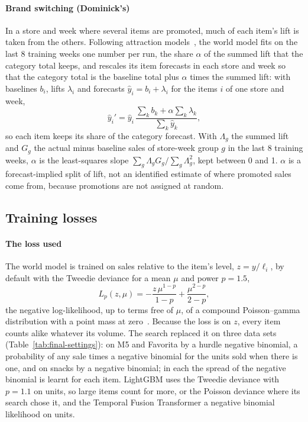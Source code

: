 \paragraph{Brand switching (Dominick's)}
In a store and week where several items are promoted, much of each item's lift
is taken from the others. Following attraction models~\cite{bell1975,cooper1988},
the world model fits on the last 8 training weeks one number per run, the share
$\alpha$ of the summed lift that the category total keeps, and rescales its item
forecasts in each store and week so that the category total is the baseline
total plus $\alpha$ times the summed lift: with baselines $b_i$, lifts
$\lambda_i$ and forecasts $\hat y_i = b_i + \lambda_i$ for the items $i$ of one
store and week,
\begin{equation}
\hat y_i' = \hat y_i\,\frac{\sum_k b_k + \alpha\sum_k \lambda_k}{\sum_k \hat y_k},
\end{equation}
so each item keeps its share of the category forecast. With $\Lambda_g$ the summed
lift and $G_g$ the actual minus baseline sales of store-week group $g$ in the
last 8 training weeks, $\alpha$ is the least-squares slope
$\sum_g \Lambda_g G_g / \sum_g \Lambda_g^2$, kept between 0 and 1.
$\alpha$ is a forecast-implied split
of lift, not an identified estimate of where promoted sales come from, because
promotions are not assigned at random.



\subsection{Training losses}
\label{sec:losses}

\paragraph{The loss used}
The world model is trained on sales relative to the item's level,
$z = y/\ell_i$, by default with the Tweedie deviance for a mean $\mu$ and power
$p = 1.5$,
\begin{equation}
L_p(z, \mu) = -\frac{z\,\mu^{1-p}}{1-p} + \frac{\mu^{2-p}}{2-p},
\end{equation}
the negative log-likelihood, up to terms free of $\mu$, of a compound
Poisson--gamma distribution with a point mass at zero~\cite{jorgensen1987}.
Because the loss is on $z$, every item counts alike whatever its volume. The
search replaced it on three data sets (Table~\ref{tab:final-settings}): on M5
and Favorita by a hurdle negative binomial, a probability of any sale times a
negative binomial for the units sold when there is one, and on snacks by a
negative binomial; in each the spread of the negative binomial is learnt for
each item. LightGBM uses the Tweedie deviance with $p = 1.1$ on units, so large
items count for more, or the Poisson deviance where its search chose it, and the
Temporal Fusion Transformer a negative binomial likelihood on units.

